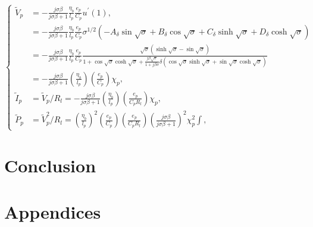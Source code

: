 \documentclass{article}
\begin{document}
\begin{equation}
    \left\{\begin{aligned}
        \tilde{V}_p &= -\frac{j \sigma \beta}{j \sigma \beta + 1} \frac{\eta_b}{l_p} \frac{e_p}{C_p} u^\prime(1), \\
        &= -\frac{j \sigma \beta}{j \sigma \beta + 1} \frac{\eta_b}{l_p} \frac{e_p}{C_p} \sigma^{1/2} \left( - A_\delta \sin{\sqrt{\sigma}} + B_\delta \cos{\sqrt{\sigma}} + C_\delta \sinh{\sqrt{\sigma}} + D_\delta \cosh{\sqrt{\sigma}} \right) \\
        &= - \frac{j \sigma \beta}{j \sigma \beta + 1} \frac{\eta_b}{l_p} \frac{e_p}{C_p}  \frac{ \sqrt{\sigma} \left( \sinh\sqrt{\sigma} - \sin\sqrt{\sigma} \right) }{ 1 + \cos\sqrt{\sigma } \cosh\sqrt{\sigma } + \frac{j \beta \sqrt{\sigma}}{ 1+ j \beta \sigma } \delta \left( \cos\sqrt{\sigma } \sinh\sqrt{\sigma } + \sin\sqrt{\sigma } \cosh\sqrt{\sigma } \right) }\\
        &= - \frac{j \sigma \beta}{j \sigma \beta + 1} \left(\frac{\eta_b}{l_p}\right) \left(\frac{e_p}{C_p}\right) \chi_p , \\
        \tilde{I}_p &=  \tilde{V}_p / R_l = - \frac{ j \sigma \beta } {j \sigma \beta + 1} \left( \frac{\eta_b}{l_p} \right) \left( \frac{e_p}{C_p R_l} \right) \chi_p , \\
        \tilde{P}_p &=  \tilde{V}_p^2 / R_l = \left(\frac{\eta_b}{l_p}\right)^2 \left(\frac{e_p}{C_p}\right) \left( \frac{e_p}{C_p R_l} \right) \left( \frac{ j \sigma \beta}{ j \sigma \beta + 1 } \right)^2 \chi_p^2∫,
    \end{aligned}\right.
    \label{eq:eq_peh_perfs_compact_form_approx}
\end{equation}





\section{Conclusion}



















\section*{Appendices}
\end{document}
